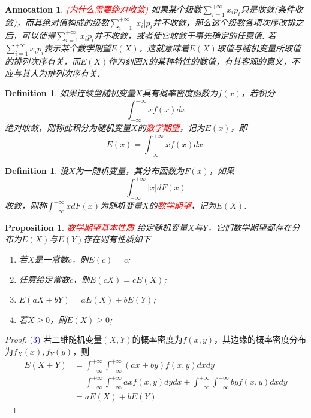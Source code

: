 \documentclass{article}
\newtheorem{proposition}[theorem]{Proposition}
\newtheorem{definition}[theorem]{Definition}
\newtheorem{annotation}[theorem]{Annotation}
\newcommand{\redt}[1]{\textcolor{red}{#1}}
\newcommand{\bluet}[1]{\textcolor{blue}{#1}}
\begin{document}
\begin{annotation}
\rm \redt{(为什么需要绝对收敛)} 如果某个级数$\sum\limits_{i=1}^{+\infty}x_ip_i$只是收敛(条件收敛)，而其绝对值构成的级数$\sum\limits_{i=1}^{+\infty}|x_i|p_i$并不收敛，那么这个级数各项次序改排之后，可以使得$\sum\limits_{i=1}^{+\infty}x_ip_i$并不收敛，或者使它收敛于事先确定的任意值. 若$\sum\limits_{i=1}^{+\infty}x_ip_i$表示某个数学期望$E(X)$，这就意味着$E(X)$取值与随机变量所取值的排列次序有关，而$E(X)$作为刻画$X$的某种特性的数值，有其客观的意义，不应与其人为排列次序有关.
\end{annotation}

\begin{definition}
\rm 如果连续型随机变量$X$具有概率密度函数为$f(x)$，若积分
$$
\int_{-\infty}^{+\infty} xf(x)dx
$$
绝对收敛，则称此积分为随机变量$X$的\redt{数学期望}，记为$E(x)$，即
$$
E(x) = \int_{-\infty}^{+\infty} xf(x)dx. 
$$
\end{definition}

\begin{definition}
\rm 设$X$为一随机变量，其分布函数为$F(x)$，如果
$$
\int_{-\infty}^{+\infty} |x|dF(x)
$$
收敛，则称$\int_{-\infty}^{+\infty} xdF(x)$为随机变量$X$的\redt{数学期望}，记为$E(X)$. 
\end{definition}

\begin{proposition}
\rm \redt{数学期望基本性质} 给定随机变量$X$与$Y$，它们数学期望都存在分布为$E(X)$与$E(Y)$存在则有性质如下
\begin{enumerate}
	\item 若$X$是一常数$c$，则$E(c) = c$;
	\item 任意给定常数$c$，则$E(cX) = cE(X)$;
	\item $E(aX \pm bY) = aE(X)\pm bE(Y)$;
	\item 若$X \geq 0$，则$E(X) \geq 0$;
\end{enumerate}
\end{proposition}

\begin{proof}
\bluet{(3)} 若二维随机变量$(X,Y)$的概率密度为$f(x,y)$，其边缘的概率密度分布为$f_X(x),f_Y(y)$，则
$$
\begin{array}{ll}
E(X+Y)&=\int_{-\infty}^{+\infty}\int_{-\infty}^{+\infty}(ax+by)f(x,y)dxdy \\
&= \int_{-\infty}^{+\infty}\int_{-\infty}^{+\infty}axf(x,y)dydx + \int_{-\infty}^{+\infty}\int_{-\infty}^{+\infty}byf(x,y)dxdy \\
&= aE(X) + bE(Y).
\end{array}
$$
\end{proof}
\end{document}
